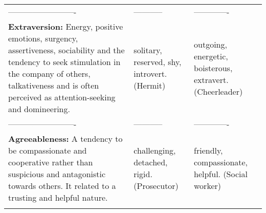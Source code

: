 \documentclass[]{book}
\begin{document}
\begin{longtable}[]{@{}lll@{}}
\begin{minipage}[t]{0.44\columnwidth}\raggedright
-------------------------\strut
\end{minipage} & \begin{minipage}[t]{0.28\columnwidth}\raggedright
-----------\strut
\end{minipage} & \begin{minipage}[t]{0.20\columnwidth}\raggedright
-------------\strut
\end{minipage}\tabularnewline
\begin{minipage}[t]{0.44\columnwidth}\raggedright
\textbf{Extraversion:} Energy, positive emotions, surgency, assertiveness, sociability and the tendency to seek stimulation in the company of others, talkativeness and is often perceived as attention-seeking and domineering.\strut
\end{minipage} & \begin{minipage}[t]{0.28\columnwidth}\raggedright
solitary, reserved, shy, introvert. (Hermit)\strut
\end{minipage} & \begin{minipage}[t]{0.20\columnwidth}\raggedright
outgoing, energetic, boisterous, extravert. (Cheerleader)\strut
\end{minipage}\tabularnewline
\begin{minipage}[t]{0.44\columnwidth}\raggedright
-------------------------\strut
\end{minipage} & \begin{minipage}[t]{0.28\columnwidth}\raggedright
-----------\strut
\end{minipage} & \begin{minipage}[t]{0.20\columnwidth}\raggedright
-------------\strut
\end{minipage}\tabularnewline
\begin{minipage}[t]{0.44\columnwidth}\raggedright
\textbf{Agreeableness:} A tendency to be compassionate and cooperative rather than suspicious and antagonistic towards others. It related to a trusting and helpful nature.\strut
\end{minipage} & \begin{minipage}[t]{0.28\columnwidth}\raggedright
challenging, detached, rigid. (Prosecutor)\strut
\end{minipage} & \begin{minipage}[t]{0.20\columnwidth}\raggedright
friendly, compassionate, helpful. (Social worker)\strut
\end{minipage}\tabularnewline
\begin{minipage}[t]{0.44\columnwidth}\raggedright

\end{minipage}
\end{longtable}
\end{document}
